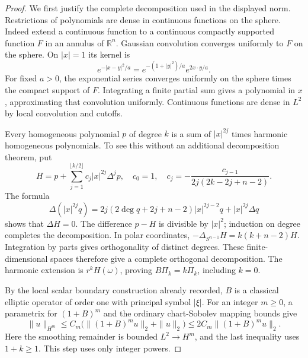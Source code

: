\begin{proof}
We first justify the complete decomposition used in the displayed norm.
Restrictions of polynomials are dense in continuous functions on the
sphere. Indeed extend a continuous function to a continuous compactly
supported function $F$ in an annulus of $\mathbb R^n$. Gaussian
convolution converges uniformly to $F$ on the sphere. On $|x|=1$ its
kernel is
\[
 e^{-|x-y|^2/a}=e^{-(1+|y|^2)/a}e^{2x\cdot y/a}.
\]
For fixed $a>0$, the exponential series converges uniformly on the
sphere times the compact support of $F$. Integrating a finite partial
sum gives a polynomial in $x$, approximating that convolution uniformly.
Continuous functions are dense in $L^2$ by local convolution and cutoffs.

Every homogeneous polynomial $p$ of degree $k$ is a sum of
$|x|^{2j}$ times harmonic homogeneous polynomials. To see this without
an additional decomposition theorem, put
\[
 H=p+\sum_{j=1}^{\lfloor k/2\rfloor}c_j|x|^{2j}\Delta^jp,
 \quad c_0=1,\quad
 c_j=-\frac{c_{j-1}}{2j(2k-2j+n-2)}.
\]
The formula
\[
 \Delta(|x|^{2j}q)
 =2j(2\deg q+2j+n-2)|x|^{2j-2}q+|x|^{2j}\Delta q
\]
shows that $\Delta H=0$. The difference $p-H$ is divisible by $|x|^2$;
induction on degree completes the decomposition. In polar coordinates,
$-\Delta_{S^{n-1}}H=k(k+n-2)H$. Integration by parts gives orthogonality
of distinct degrees. These finite-dimensional spaces therefore give a
complete orthogonal decomposition. The harmonic extension is
$r^kH(\omega)$, proving $B\Pi_k=k\Pi_k$, including $k=0$.

By the local scalar boundary construction already recorded,
$B$ is a classical elliptic operator of order one with principal
symbol $|\xi|$. For an integer $m\ge0$, a parametrix for $(1+B)^m$
and the ordinary chart-Sobolev mapping bounds give
\[
 \|u\|_{H^m}\le C_m\bigl(\|(1+B)^mu\|_2+\|u\|_2\bigr)
 \le 2C_m\|(1+B)^mu\|_2.
\]
Here the smoothing remainder is bounded $L^2\to H^m$, and the last
inequality uses $1+k\ge1$. This step uses only integer powers.


\end{proof}
